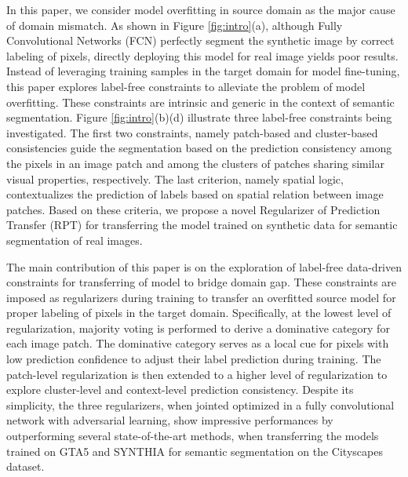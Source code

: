 \documentclass[10pt,twocolumn,letterpaper]{article}
\begin{document}
In this paper, we consider model overfitting in source domain as the major cause of domain mismatch. As shown in Figure \ref{fig:intro}(a), although Fully Convolutional Networks (FCN) perfectly segment the synthetic image by correct labeling of pixels, directly deploying this model for real image yields poor results. Instead of leveraging training samples in the target domain for model fine-tuning, this paper explores label-free constraints to alleviate the problem of model overfitting. These constraints are intrinsic and generic in the context of semantic segmentation. Figure \ref{fig:intro}(b)(d) illustrate three label-free constraints being investigated. The first two constraints, namely patch-based and cluster-based consistencies guide the segmentation based on the prediction consistency among the pixels in an image patch and among the clusters of patches sharing similar visual properties, respectively. The last criterion, namely spatial logic, contextualizes the prediction of labels based on spatial relation between image patches. Based on these criteria, we propose a novel Regularizer of Prediction Transfer (RPT) for transferring the model trained on synthetic data for semantic segmentation of real images.

The main contribution of this paper is on the exploration of label-free data-driven constraints for transferring of model to bridge domain gap. These constraints are imposed as regularizers during training to transfer an overfitted source model for proper labeling of pixels in the target domain. Specifically, at the lowest level of regularization, majority voting is performed to derive a dominative category for each image patch. The dominative category serves as a local cue for pixels with low prediction confidence to adjust their label prediction during training. The patch-level regularization is then extended to a higher level of regularization to explore cluster-level and context-level prediction consistency.
Despite its simplicity, the three regularizers, when jointed optimized in a fully convolutional network with adversarial learning, show impressive performances by outperforming several state-of-the-art methods, when transferring the models trained on GTA5 and SYNTHIA for semantic segmentation on the Cityscapes dataset.

\vspace{-0.05in}
\end{document}
